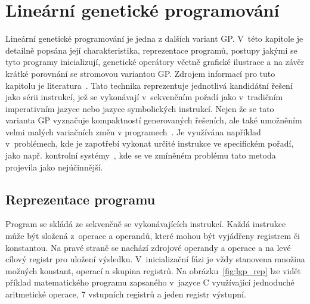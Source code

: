 \chapter{Lineární genetické programování}\label{ch:3}
Lineární genetické programování je jedna z dalších variant GP. V~této kapitole je detailně popsána její charakteristika, reprezentace programů, postupy jakými se tyto programy inicializují, genetické operátory včetně grafické ilustrace a na závěr krátké porovnání se stromovou variantou GP. Zdrojem informací pro tuto kapitolu je literatura~\cite{LGP}. Tato technika reprezentuje jednotlivá kandidátní řešení jako sérii instrukcí, jež se vykonávají v~sekvenčním pořadí jako v~tradičním imperativním jazyce nebo jazyce symbolických instrukcí. Nejen že se tato varianta GP vyznačuje kompaktností generovaných řešeních, ale také umožněním velmi malých variačních změn v programech~\cite[str. 8]{LGP}. Je využívána například v~problémech, kde je zapotřebí vykonat určité instrukce ve specifickém pořadí, jako např. kontrolní systémy~\cite{realtimefeedback}, kde se ve zmíněném problému tato metoda projevila jako nejúčinnější.

\section{Reprezentace programu}
Program se skládá ze sekvenčně se vykonávajících instrukcí. Každá instrukce může být složená z~operace a operandů, které mohou být vyjádřeny registrem či konstantou. Na pravé straně se nachází zdrojové operandy a operace a na levé cílový registr pro uložení výsledku. V~inicializační fázi je vždy stanovena množina možných konstant, operací a skupina registrů. Na obrázku~\ref{fig:lgp_rep} lze vidět příklad matematického programu zapsaného v~jazyce C využívající jednoduché aritmetické operace, 7 vstupních registrů a jeden registr výstupní.

